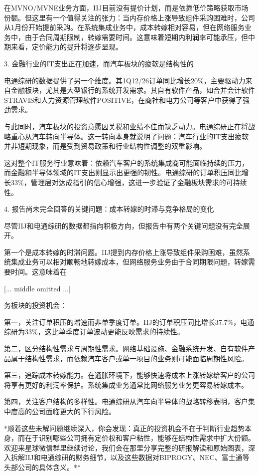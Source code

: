 \documentclass[11pt]{ctexart}
\begin{document}
在MVNO/MVNE业务方面，IIJ目前没有提价计划，而是依靠低价策略获取市场份额。但这里有一个值得关注的张力：当内存价格上涨导致组件采购困难时，公司从1月份开始提前采购。在系统集成业务中，成本转嫁相对容易，但在网络服务业务中，由于合同周期限制，转嫁需要时间。这意味着短期内利润率可能承压，但中期来看，定价能力的提升将逐步显现。

3. 金融行业的IT支出正在加速，而汽车板块的疲软是结构性的

电通综研的数据提供了另一个维度。其1Q12/26订单同比增长20\%，主要驱动力来自金融板块，尤其是大型银行的系统开发需求。其自有软件产品，如合并会计软件STRAVIS和人力资源管理软件POSITIVE，在商社和电力公司等客户中获得了强劲需求。

与此同时，汽车板块的投资意愿因关税和业绩不佳而缺乏动力。电通综研正在将战略重心从汽车转向半导体。这一转向本身就说明了问题：汽车行业的IT支出疲软并非短期现象，而是受到贸易政策和行业结构性调整的双重影响。

这对整个IT服务行业意味着：依赖汽车客户的系统集成商可能面临持续的压力，而金融和半导体领域的IT支出则显示出更强的韧性。电通综研的订单积压同比增长33\%，管理层对达成指引的信心增强，这进一步验证了金融板块需求的可持续性。

4. 报告尚未完全回答的关键问题：成本转嫁的时滞与竞争格局的变化

尽管IIJ和电通综研的数据都指向积极方向，但报告中有两个关键问题没有完全展开。

第一个是成本转嫁的时滞问题。IIJ提到内存价格上涨导致组件采购困难，虽然系统集成业务可以相对顺畅地转嫁成本，但网络服务业务由于合同期限问题，转嫁需要时间。这意味着在

[... middle omitted ...]

务板块的投资机会：

第一，关注订单积压的增速而非单季度订单。IIJ的订单积压同比增长37.7\%，电通综研为33\%，这比单季度订单波动更能反映需求的持续性。

第二，区分结构性需求与周期性需求。网络基础设施、金融系统开发、自有软件产品属于结构性需求，而依赖汽车客户或单一项目的业务则可能面临周期性风险。

第三，追踪成本转嫁能力。在通胀环境下，能够快速将成本上涨转嫁给客户的公司将享有更好的利润率保护。系统集成业务通常比网络服务业务更容易转嫁成本。

第四，关注客户结构的多样性。电通综研从汽车向半导体的战略转移表明，客户集中度高的公司面临更大的下行风险。

*顺着这些未解问题继续深入，你会发现：真正的投资机会不在于判断行业趋势本身，而在于识别哪些公司拥有定价权和客户粘性，能够在结构性需求中扩大份额。欢迎来星球微信群里继续讨论，我们会在那里分享完整的研报解读和原始图表，深入拆解IIJ和电通综研的财务细节，以及这些数据对BIPROGY、NEC、富士通等头部公司的具体含义。**
\end{document}
